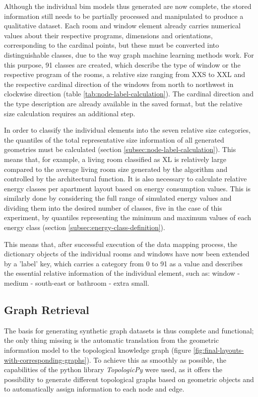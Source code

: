 \documentclass[a4paper, 12pt]{report}
\begin{document}
Although the individual \acrshort{bim} models thus generated are now complete, the stored information still needs to be partially processed and manipulated to produce a qualitative dataset. Each room and window element already carries numerical values about their respective programs, dimensions and orientations, corresponding to the cardinal points, but these must be converted into distinguishable classes, due to the way graph machine learning methods work. For this purpose, 91 classes are created, which describe the type of window or the respective program of the rooms, a relative size ranging from XXS to XXL and the respective cardinal direction of the windows from north to northwest in clockwise direction (table \ref{tab:node-label-calculation}). The cardinal direction and the type description are already available in the saved format, but the relative size calculation requires an additional step.

In order to classify the individual elements into the seven relative size categories, the \glspl{quantile} of the total representative size information of all generated geometries must be calculated (section \ref{subsec:node-label-calculation}). This means that, for example, a living room classified as XL is relatively large compared to the average living room size generated by the algorithm and controlled by the architectural function. It is also necessary to calculate relative energy classes per apartment layout based on energy consumption values. This is similarly done by considering the full range of simulated energy values and dividing them into the desired number of classes, five in the case of this experiment, by \glspl{quantile} representing the minimum and maximum values of each energy class (section \ref{subsec:energy-class-definition}).

This means that, after successful execution of the data mapping process, the \gls{dictionary} objects of the individual rooms and windows have now been extended by a 'label' key, which carries a category from 0 to 91 as a value and describes the essential relative information of the individual element, such as: window - medium - south-east or bathroom - extra small.

\subsection{Graph Retrieval}\label{subsec:graph-retrieval}

The basis for generating synthetic graph datasets is thus complete and functional; the only thing missing is the automatic translation from the geometric information model to the topological \gls{knowledge graph} (figure \ref{fig:final-layouts-with-corresponding-graphs}). To achieve this as smoothly as possible, the capabilities of the \Gls{python} library \textit{TopologicPy} were used, as it offers the possibility to generate different topological graphs based on geometric objects and to automatically assign information to each node and edge.
\end{document}
